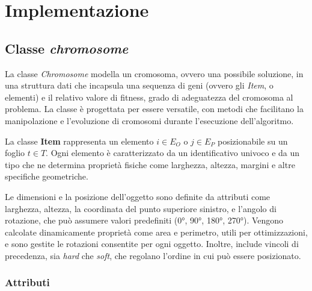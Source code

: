 \chapter{Implementazione} \hypertarget{cleancode}{} \hypertarget{chiara2}{}
\label{cap:progettazione-codifica}


\section{Classe \emph{chromosome}}

La classe \emph{Chromosome} modella un cromosoma, ovvero una possibile soluzione, in una struttura dati che incapsula una sequenza di geni (ovvero gli \emph{Item}, o elementi) e il relativo valore di fitness, grado di adeguatezza del cromosoma al problema. La classe è progettata per essere versatile, con metodi che facilitano la manipolazione e l'evoluzione di cromosomi durante l'esecuzione dell'algoritmo.

La classe \textbf{Item} rappresenta un elemento \( i \in E_O\) o \( j \in E_P\) posizionabile su un foglio \( t \in T \). Ogni elemento è caratterizzato da un identificativo univoco e da un tipo che ne determina proprietà fisiche come larghezza, altezza, margini e altre specifiche geometriche.

Le dimensioni e la posizione dell'oggetto sono definite da attributi come larghezza, altezza, la coordinata del punto superiore sinistro, e l'angolo di rotazione, che può assumere valori predefiniti (0°, 90°, 180°, 270°). Vengono calcolate dinamicamente proprietà come area e perimetro, utili per ottimizzazioni, e sono gestite le rotazioni consentite per ogni oggetto. Inoltre, include vincoli di precedenza, sia \emph{hard} che \emph{soft}, che regolano l'ordine in cui può essere posizionato.

\subsection{Attributi}

